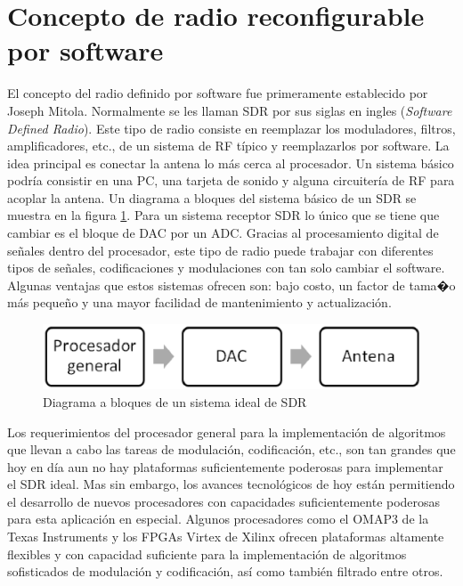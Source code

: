 \section{Concepto de radio reconfigurable por software}

El concepto del radio definido por software fue primeramente establecido por
Joseph Mitola\citeyear{mitola}. Normalmente se les llaman SDR por sus siglas en
ingles (\emph{Software Defined Radio}). Este tipo de radio consiste en
reemplazar los moduladores, filtros, amplificadores, etc., de un sistema de RF
t\'ipico y reemplazarlos por software. La idea principal es conectar la antena
lo m\'as cerca al procesador. Un sistema b\'asico podr\'ia consistir en una PC,
una tarjeta de sonido y alguna circuiter\'ia de RF para acoplar la antena.
Un diagrama a bloques del sistema b\'asico de un SDR se muestra en la figura
\ref{fig:sdr}. Para un sistema receptor SDR lo \'unico que se tiene que cambiar
es el bloque de DAC por un ADC. Gracias al procesamiento digital de se\~nales dentro del
procesador, este tipo de radio puede trabajar con diferentes tipos de se\~nales,
codificaciones y modulaciones con tan solo cambiar el software. Algunas ventajas
que estos sistemas ofrecen son: bajo costo, un factor de tama�o m\'as peque\~no
y una mayor facilidad de mantenimiento y actualizaci\'on.

\begin{figure}[hpt]
\centering
	\includegraphics[width=5.5in]{figs/sdr}
	\caption{Diagrama a bloques de un sistema ideal de SDR}
	\label{fig:sdr}
\end{figure}

Los requerimientos del procesador general para la implementaci\'on de algoritmos
que llevan a cabo las tareas de modulaci\'on, codificaci\'on, etc., son tan
grandes que hoy en d\'ia aun no hay plataformas suficientemente poderosas para
implementar el SDR ideal. Mas sin embargo, los avances tecnol\'ogicos de hoy
est\'an permitiendo el desarrollo de nuevos procesadores con capacidades
suficientemente poderosas para esta aplicaci\'on en especial. Algunos
procesadores como el OMAP3 de la Texas Instruments \cite{ti} y los FPGAs Virtex
de Xilinx \cite{lyrtech} ofrecen plataformas altamente flexibles
y con capacidad suficiente para la implementaci\'on de algoritmos sofisticados
de modulaci\'on y codificaci\'on, as\'i como tambi\'en filtrado entre otros.

